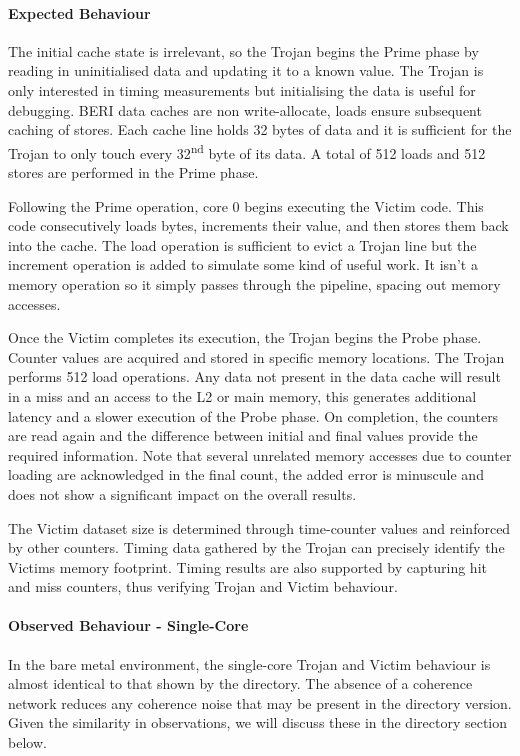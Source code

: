 				\paragraph{Expected Behaviour}
					The initial cache state is irrelevant, so the Trojan begins the Prime phase by reading in uninitialised data and updating it to a known value. The Trojan is only interested in timing measurements but initialising the data is useful for debugging. BERI data caches are non write-allocate, loads ensure subsequent caching of stores. Each cache line holds 32 bytes of data and it is sufficient for the Trojan to only touch every 32\textsuperscript{nd} byte of its data. A total of 512 loads and 512 stores are performed in the Prime phase.
					
					Following the Prime operation, core 0 begins executing the Victim code. This code consecutively loads bytes, increments their value, and then stores them back into the cache. The load operation is sufficient to evict a Trojan line but the increment operation is added to simulate some kind of useful work. It isn't a memory operation so it simply passes through the pipeline, spacing out memory accesses.
					
					Once the Victim completes its execution, the Trojan begins the Probe phase. Counter values are acquired and stored in specific memory locations. The Trojan performs 512 load operations. Any data not present in the data cache will result in a miss and an access to the L2 or main memory, this generates additional latency and a slower execution of the Probe phase. 
					On completion, the counters are read again and the difference between initial and final values provide the required information. Note that several unrelated memory accesses due to counter loading are acknowledged in the final count, the added error is minuscule and does not show a significant impact on the overall results.
					
					The Victim dataset size is determined through time-counter values and reinforced by other counters. Timing data gathered by the Trojan can precisely identify the Victims memory footprint. Timing results are also supported by capturing hit and miss counters, thus verifying Trojan and Victim behaviour.
				
				\paragraph{Observed Behaviour - Single-Core}
					In the bare metal environment, the single-core Trojan and Victim behaviour is almost identical to that shown by the directory. The absence of a coherence network reduces any coherence noise that may be present in the directory version. Given the similarity in observations, we will discuss these in the directory section below.
				
